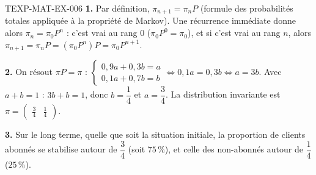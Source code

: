 \begin{corrige}{TEXP-MAT-EX-006}
\textbf{1.} Par définition, $\pi_{n+1}=\pi_nP$ (formule des probabilités totales appliquée à la propriété de Markov). Une récurrence immédiate donne alors $\pi_n=\pi_0P^n$ : c'est vrai au rang $0$ ($\pi_0P^0=\pi_0$), et si c'est vrai au rang $n$, alors $\pi_{n+1}=\pi_nP=(\pi_0P^n)P=\pi_0P^{n+1}$.

\textbf{2.} On résout $\pi P=\pi$ : $\begin{cases}0{,}9a+0{,}3b=a\\0{,}1a+0{,}7b=b\end{cases}\iff0{,}1a=0{,}3b\iff a=3b$. Avec $a+b=1$ : $3b+b=1$, donc $b=\dfrac{1}{4}$ et $a=\dfrac{3}{4}$. La distribution invariante est $\pi=\begin{pmatrix}\tfrac{3}{4}&\tfrac{1}{4}\end{pmatrix}$.

\textbf{3.} Sur le long terme, quelle que soit la situation initiale, la proportion de clients abonnés se stabilise autour de $\dfrac{3}{4}$ (soit $75\,\%$), et celle des non-abonnés autour de $\dfrac{1}{4}$ ($25\,\%$).
\end{corrige}
